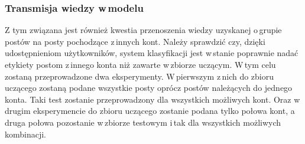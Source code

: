 \subsubsection{Transmisja wiedzy w\,modelu}
Z tym związana jest również kwestia przenoszenia wiedzy uzyskanej o\,grupie postów na posty pochodzące z\,innych kont. Należy sprawdzić czy, dzięki udostępnieniom użytkowników, system klasyfikacji jest w\,stanie poprawnie nadać etykiety postom z\,innego konta niż zawarte w\,zbiorze uczącym. W\,tym celu zostaną przeprowadzone dwa eksperymenty. W\,pierwszym z\,nich do zbioru uczącego zostaną podane wszystkie posty oprócz postów należących do jednego konta. Taki test zostanie przeprowadzony dla wszystkich możliwych kont. Oraz w\,drugim eksperymencie do zbioru uczącego zostanie podana tylko połowa kont, a\,druga połowa pozostanie w\,zbiorze testowym i\,tak dla wszystkich możliwych kombinacji.